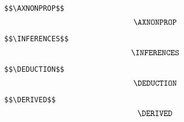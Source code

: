 %
%
%
%
%
%

\newpage
\verb"$$\AXNONPROP$$"
$$\AXNONPROP$$


\newpage
\verb"$$\INFERENCES$$"
$$\INFERENCES$$

\verb"$$\DEDUCTION$$"
$$\DEDUCTION$$

\newpage
\verb"$$\DERIVED$$"
$$\DERIVED$$


